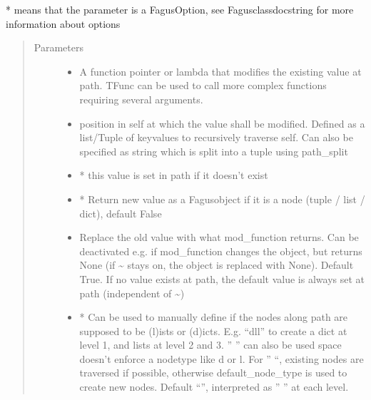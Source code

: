 \documentclass[a4paper,10pt,english]{sphinxmanual}
\begin{document}
\begin{fulllineitems}
\begin{fulllineitems}
\sphinxAtStartPar
* means that the parameter is a FagusOption, see Fagus\sphinxhyphen{}class\sphinxhyphen{}docstring for more information about options
\begin{quote}\begin{description}
\item[{Parameters}] \leavevmode\begin{itemize}
\item {}
\sphinxAtStartPar
{} \textendash{} A function pointer or lambda that modifies the existing value at path. TFunc can be used to
call more complex functions requiring several arguments.

\item {}
\sphinxAtStartPar
{} \textendash{} position in self at which the value shall be modified. Defined as a list/Tuple of key\sphinxhyphen{}values to
recursively traverse self. Can also be specified as string which is split into a tuple using path\_split

\item {}
\sphinxAtStartPar
{} \textendash{} * this value is set in path if it doesn’t exist

\item {}
\sphinxAtStartPar
{} \textendash{} * Return new value as a Fagus\sphinxhyphen{}object if it is a node (tuple / list / dict), default False

\item {}
\sphinxAtStartPar
{} \textendash{} Replace the old value with what mod\_function returns. Can be deactivated e.g. if mod\_function
changes the object, but returns None (if \textasciitilde{} stays on, the object is replaced with None). Default True.
If no value exists at path, the default value is always set at path (independent of \textasciitilde{})

\item {}
\sphinxAtStartPar
{} \textendash{} * Can be used to manually define if the nodes along path are supposed to be (l)ists or
(d)icts. E.g. “dll” to create a dict at level 1, and lists at level 2 and 3. ” ” can also be used \sphinxhyphen{}
space doesn’t enforce a node\sphinxhyphen{}type like d or l. For ” “, existing nodes are traversed if possible,
otherwise default\_node\_type is used to create new nodes. Default “”, interpreted as ” ” at each level.


\end{itemize}
\end{description}
\end{quote}
\end{fulllineitems}
\end{fulllineitems}
\end{document}
